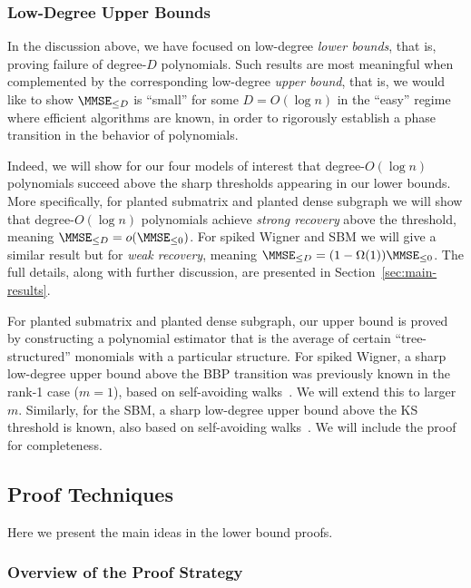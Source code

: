 \documentclass[11pt]{article}
\begin{document}
\subsubsection{Low-Degree Upper Bounds}

In the discussion above, we have focused on low-degree \emph{lower bounds}, that is, proving failure of degree-$D$ polynomials. Such results are most meaningful when complemented by the corresponding low-degree \emph{upper bound}, that is, we would like to show $\MMSE_{\le D}$ is ``small'' for some $D = O(\log n)$ in the ``easy'' regime where efficient algorithms are known, in order to rigorously establish a phase transition in the behavior of polynomials.

Indeed, we will show for our four models of interest that degree-$O(\log n)$ polynomials succeed above the sharp thresholds appearing in our lower bounds. More specifically, for planted submatrix and planted dense subgraph we will show that degree-$O(\log n)$ polynomials achieve \emph{strong recovery} above the threshold, meaning $\MMSE_{\le D} = o(\MMSE_{\le 0})$. For spiked Wigner and SBM we will give a similar result but for \emph{weak recovery}, meaning $\MMSE_{\le D} = (1-\Omega(1)) \MMSE_{\le 0}$. The full details, along with further discussion, are presented in Section~\ref{sec:main-results}.

For planted submatrix and planted dense subgraph, our upper bound is proved by constructing a polynomial estimator that is the average of certain ``tree-structured'' monomials with a particular structure. For spiked Wigner, a sharp low-degree upper bound above the BBP transition was previously known in the rank-1 case ($m=1$), based on self-avoiding walks~\cite{HS-bayesian}. We will extend this to larger $m$. Similarly, for the SBM, a sharp low-degree upper bound above the KS threshold is known, also based on self-avoiding walks~\cite{HS-bayesian}. We will include the proof for completeness.






\subsection{Proof Techniques}
\label{sec:pf-techniques}


Here we present the main ideas in the lower bound proofs.

\subsubsection{Overview of the Proof Strategy}
\label{sec:overview-proof}
\end{document}
